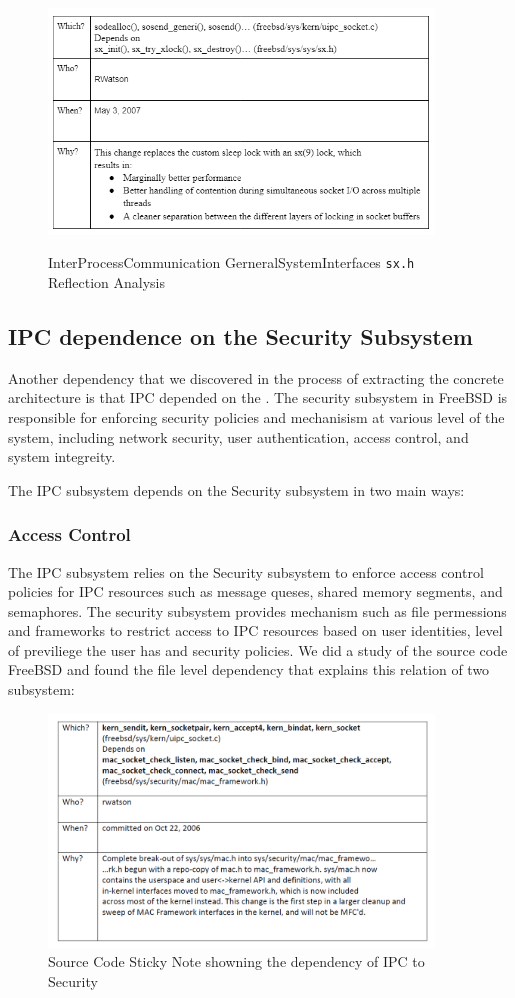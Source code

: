 \documentclass[12pt, dvipsnames, a4paper]{article}
\newcommand{\code}[1]{\texttt{#1}}
\begin{document}
\begin{figure}[hbt!]
	\centering
	\includegraphics[width=290pt]{assets/IPC_Sx.png}
	\caption{InterProcessCommunication \-\> GerneralSystemInterfaces \code{sx.h} Reflection Analysis}\cite{sx}
\end{figure}

\subsection{IPC dependence on the Security Subsystem}
Another dependency that we discovered in the process of extracting the concrete architecture is that IPC depended on the . The security subsystem in FreeBSD is responsible for enforcing security policies and mechanisism at various level of the system, including network security, user authentication, access control, and system integreity. 

The IPC subsystem depends on the Security subsystem in two main ways:

\subsubsection{Access Control}
The IPC subsystem relies on the Security subsystem to enforce access control policies for IPC resources such as message queses, shared memory segments, and semaphores. The security subsystem provides mechanism such as file permessions and  frameworks to restrict access to IPC resources based on user identities, level of previliege the user has and security policies. We did a study of the source code FreeBSD and found the file level dependency that explains this relation of two subsystem:

\begin{figure}[hbt!]
	\centering
	\includegraphics[width=290pt]{assets/4Ws_2.png}
	\caption{Source Code Sticky Note showning the dependency of IPC to Security} 
\end{figure}
\end{document}
